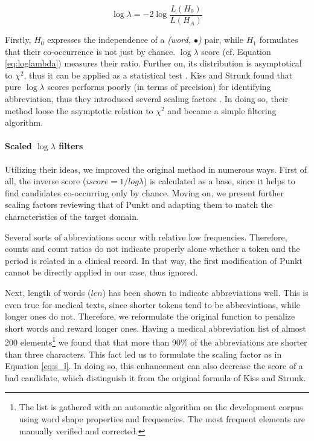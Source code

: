 \begin{equation} \label{eq:loglambda}
\log \lambda = -2 \log \frac{L(H_0)}{L(H_A)}
\end{equation}


Firstly, $H_0$ expresses the independence of a \emph{(word, $\bullet$)} pair, while $H_1$ formulates that their co-occurrence is not just by chance. 
$\log \lambda$ score (cf. Equation \eqref{eq:loglambda}) measures their ratio. 
Further on, its distribution is asymptotical to $\chi^2$, thus  it can be applied as a statistical test \cite{dunning1993accurate}. 
Kiss and Strunk found that pure $\log \lambda$ scores performs poorly (in terms of precision) for identifying abbreviation, thus they introduced several scaling factors \cite{kiss2006unsupervised}. 
In doing so, their method loose the asymptotic relation to $\chi^2$ and became a simple filtering algorithm.

\paragraph{Scaled $\log\lambda$ filters}

Utilizing their ideas, we improved the original method in numerous ways. 
First of all, the inverse score ($iscore=1/log\lambda$) is calculated as a base, since it helps to find candidates co-occurring only by chance. 
Moving on, we present further scaling factors reviewing that of Punkt and adapting them to match the characteristics of the target domain.

Several sorts of abbreviations occur with relative low frequencies. Therefore, counts and count ratios do not indicate properly alone whether a token and the period is related in a clinical record. 
In that way, the first modification of Punkt \cite{kiss2006unsupervised} cannot be directly applied in our case, thus ignored. 

Next, length of words ($len$) has been shown to indicate abbreviations well. 
This is even true for medical texts, since shorter tokens tend to be abbreviations, while longer ones do not. 
Therefore, we reformulate the original function to penalize short words and reward longer ones. 
Having a medical abbreviation list of almost 200 \label{sec:abbrev} elements\footnote{The list is gathered with an automatic algorithm on the development corpus using word shape properties and frequencies. The most frequent elements are manually verified and corrected.} 
we found that that more than 90\% of the abbreviations are shorter than three characters. 
This fact led us to formulate the scaling factor as in Equation \eqref{eq:s_l}. 
In doing so, this enhancement can also decrease the score of a bad candidate, which distinguish it from the original formula of Kiss and Strunk.

